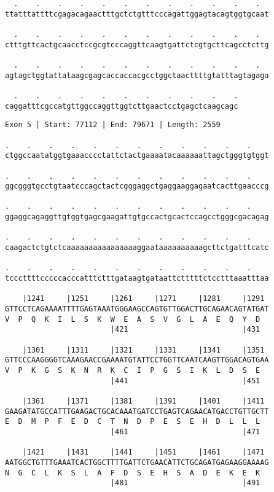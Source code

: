 \documentclass{article}
\begin{document}
\begin{Verbatim}
  .    .    .    .    .    .    .    .    .    .    .    .  
ttatttattttcgagacagaactttgctctgtttcccagattggagtacagtggtgcaat
  
  .    .    .    .    .    .    .    .    .    .    .    .  
ctttgttcactgcaacctccgcgtcccaggttcaagtgattctcgtgcttcagcctcttg
  
  .    .    .    .    .    .    .    .    .    .    .    .  
agtagctggtattataagcgagcaccaccacgcctggctaacttttgtatttagtagaga
  
  .    .    .    .    .    .    .    .    .    .    .
caggatttcgccatgttggccaggttggtcttgaactcctgagctcaagcagc
\end{Verbatim}
\newpage
\begin{Verbatim}
Exon 5 | Start: 77112 | End: 79671 | Length: 2559
 
.    .    .    .    .    .    .    .    .    .    .    .    
ctggccaatatggtgaaacccctattctactgaaaatacaaaaaattagctgggtgtggt
  
.    .    .    .    .    .    .    .    .    .    .    .    
ggcgggtgcctgtaatcccagctactcgggaggctgaggaaggagaatcacttgaacccg
  
.    .    .    .    .    .    .    .    .    .    .    .    
ggaggcagaggttgtggtgagcgaagattgtgccactgcactccagcctgggcgacagag
  
.    .    .    .    .    .    .    .    .    .    .    .    
caagactctgtctcaaaaaaaaaaaaaaaaggaataaaaaaaaaagcttctgatttcatc
  
.    .    .    .    .    .    .    .    .    .    .    .    
tcccttttcccccacccatttctttgataagtgataattctttttctcctttaaatttaa
  
    |1241     |1251     |1261     |1271     |1281     |1291 
GTTCCTCAGAAAATTTTGAGTAAATGGGAAGCCAGTGTTGGACTTGCAGAACAGTATGAT
V  P  Q  K  I  L  S  K  W  E  A  S  V  G  L  A  E  Q  Y  D  
                        |421                          |431  
  
    |1301     |1311     |1321     |1331     |1341     |1351 
GTTCCCAAGGGGTCAAAGAACCGAAAATGTATTCCTGGTTCAATCAAGTTGGACAGTGAA
V  P  K  G  S  K  N  R  K  C  I  P  G  S  I  K  L  D  S  E  
                        |441                          |451  
  
    |1361     |1371     |1381     |1391     |1401     |1411 
GAAGATATGCCATTTGAAGACTGCACAAATGATCCTGAGTCAGAACATGACCTGTTGCTT
E  D  M  P  F  E  D  C  T  N  D  P  E  S  E  H  D  L  L  L  
                        |461                          |471  
  
    |1421     |1431     |1441     |1451     |1461     |1471 
AATGGCTGTTTGAAATCACTGGCTTTTGATTCTGAACATTCTGCAGATGAGAAGGAAAAG
N  G  C  L  K  S  L  A  F  D  S  E  H  S  A  D  E  K  E  K  
                        |481                          |491  
  

\end{Verbatim}
\end{document}
